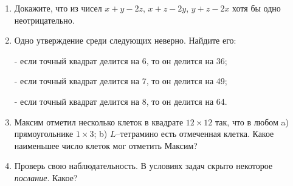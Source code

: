\documentclass{article}
\begin{document}
\begin{enumerate}[label*=\protect\fbox{\arabic{enumi}}]
\item Докажите, что из чисел $x+y-2z$, $x+z-2y$, $y+z-2x$ хотя бы одно неотрицательно.

\item Одно утверждение среди следующих неверно. Найдите его: 

- если точный квадрат делится на 6, то он делится на 36;

- если точный квадрат делится на 7, то он делится на 49;

- если точный квадрат делится на 8, то он делится на 64.

\item Максим отметил несколько клеток в квадрате $12 \times 12$ так, что в любом a) прямоугольнике $1 \times 3$; b) $L$--тетрамино есть отмеченная клетка. Какое наименьшее число клеток мог отметить Максим?

\item Проверь свою наблюдательность. В условиях задач скрыто некоторое \emph{послание}. Какое? 

\end{enumerate}
\end{document}
